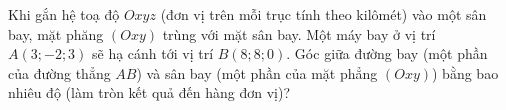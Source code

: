 \begin{ex}%
	Khi gắn hệ toạ độ $Oxyz$ (đơn vị trên mỗi trục tính theo kilômét) vào một sân bay, mặt phăng $(Oxy)$ trùng với mặt sân bay. Một máy bay ở vị trí $A(3 ; - 2 ; 3)$ sẽ hạ cánh tới vị trí $B(8 ; 8 ; 0)$. Góc giữa đường bay (một phần của đường thẳng $AB$) và sân bay (một phần của mặt phẳng $(Oxy)$) bằng bao nhiêu độ (làm tròn kết quả đến hàng đơn vị)?
\end{ex}

